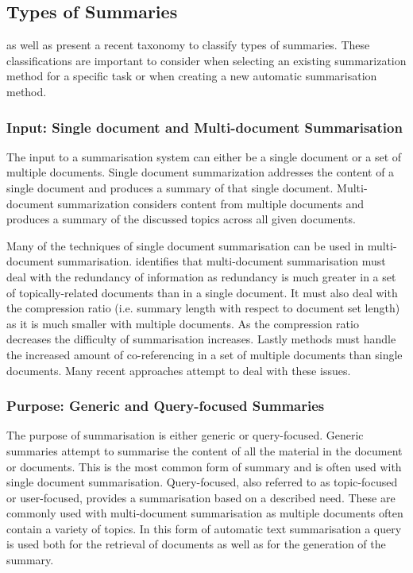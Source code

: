 \subsection{Types of Summaries}
\label{subsec:2.1.2}

\citet{gambhir2017recent} as well as \citet{oruasan2019automatic} present a recent taxonomy to classify types of summaries. These classifications are important to consider when selecting an existing summarization method for a specific task or when creating a new automatic summarisation method. 

\subsubsection{Input: Single document and Multi-document Summarisation}

The input to a summarisation system can either be a single document or a set of multiple documents. Single document summarization addresses the content of a single document and produces a summary of that single document. Multi-document summarization considers content from multiple documents and produces a summary of the discussed topics across all given documents. 

Many of the techniques of single document summarisation can be used in multi-document summarisation. \citet{goldstein2000multi}identifies that multi-document summarisation must deal with the redundancy of information as redundancy is much greater in a set of topically-related documents than in a single document. It must also deal with the compression ratio (i.e. summary length with respect to document set length) as it is much smaller with multiple documents. As the compression ratio decreases the difficulty of summarisation increases. Lastly methods must handle the increased amount of co-referencing in a set of multiple documents than single documents. Many recent approaches attempt to deal with these issues. 

\subsubsection{Purpose: Generic and Query-focused Summaries}

The purpose of summarisation is either generic or query-focused. Generic summaries attempt to summarise the content of all the material in the document or documents. This is the most common form of summary and is often used with single document summarisation. Query-focused, also referred to as topic-focused or user-focused, provides a summarisation based on a described need. These are commonly used with multi-document summarisation as multiple documents often contain a variety of topics. In this form of automatic text summarisation a query is used both for the retrieval of documents as well as for the generation of the summary. 

